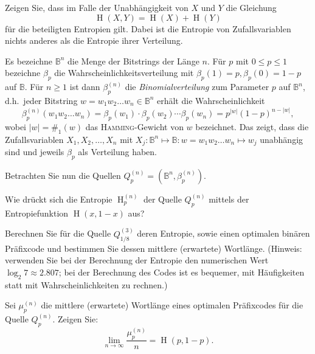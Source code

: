 \begin{flushenum}
	\item Zeigen Sie, dass im Falle der Unabhängigkeit von $X$ und $Y$ die Gleichung
		\[ \operatorname{H}(X,Y) = \operatorname{H}(X) +
		\operatorname{H}(Y) \]
		für die beteiligten Entropien gilt. Dabei ist die Entropie von
		Zufallsvariablen nichts anderes als die Entropie ihrer
		Verteilung.
	\item Es bezeichne $\mathbb{B}^n$ die Menge der Bitstrings der Länge
		$n$. Für $p$ mit $0\leq p\leq 1$ bezeichne $\beta_p$ die
		Wahrscheinlichkeitsverteilung mit $\beta_p(1) = p, \beta_p(0) =
		1 - p$ auf $\mathbb{B}$. Für $n\geq 1$ ist dann $\beta_p^{(n)}$
		die \emph{Binomialverteilung} zum Parameter $p$ auf
		$\mathbb{B}^n$, d.h.\ jeder Bitstring $w = w_1 w_2 \dots w_n
		\in \mathbb{B}^n$ erhält die Wahrscheinlichkeit
		\[ \beta_p^{(n)}(w_1 w_2 \dots w_n) =
		\beta_p(w_1)\cdot\beta_p(w_2) \cdots \beta_p(w_n) = p^{\lvert
		w\rvert}(1-p)^{n-\lvert w\rvert}, \]
		wobei $\lvert w\rvert = \#_1(w)$ das \textsc{Hamming}-Gewicht
		von $w$ bezeichnet. Das zeigt, dass die Zufallsvariablen $X_1,
		X_2, \dots, X_n$ mit $X_j : \mathbb{B}^n \mapsto \mathbb{B} : w
		= w_1 w_2 \dots w_n \mapsto w_j$ unabhängig sind und jeweils
		$\beta_p$ als Verteilung haben.

		Betrachten Sie nun die Quellen $Q_p^{(n)} = \left(\mathbb{B}^n,
		\beta_p^{(n)}\right)$.
		\begin{flushalpha}
			\item Wie drückt sich die Entropie
				$\operatorname{H}_p^{(n)}$ der Quelle
				$Q_p^{(n)}$ mittels der
				En\-tro\-pie\-funk\-tion $\operatorname{H}(x,
				1-x)$ aus?
			\item Berechnen Sie für die Quelle $Q_{1/8}^{(3)}$
				deren Entropie, sowie einen optimalen binären
				Präfixcode und bestimmen Sie dessen mittlere
				(erwartete) Wortlänge. (Hinweis: verwenden Sie
				bei der Berechnung der Entropie den numerischen
				Wert $\log_2 7 \approx 2.807$; bei der
				Berechnung des Codes ist es bequemer, mit
				Häufigkeiten statt mit Wahrscheinlichkeiten zu
				rechnen.)
			\item Sei $\mu_p^{(n)}$ die mittlere (erwartete)
				Wortlänge eines optimalen Präfixcodes für die
				Quelle $Q_p^{(n)}$. Zeigen Sie:
				\[ \lim_{n\rightarrow\infty}
				\frac{\mu_p^{(n)}}{n} = \operatorname{H}(p,
				1-p). \]
		\end{flushalpha}
\end{flushenum}
